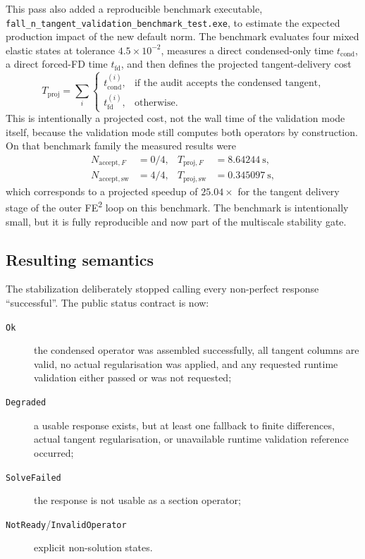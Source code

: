 This pass also added a reproducible benchmark executable,
\texttt{fall\_n\_tangent\_validation\_benchmark\_test.exe}, to estimate the
expected production impact of the new default norm.  The benchmark evaluates
four mixed elastic states at tolerance \(4.5\times 10^{-2}\), measures a
direct condensed-only time \(t_{\mathrm{cond}}\), a direct forced-FD time
\(t_{\mathrm{fd}}\), and then defines the projected tangent-delivery cost
\begin{equation}
  T_{\mathrm{proj}}
  =
  \sum_i
  \begin{cases}
    t_{\mathrm{cond}}^{(i)}, & \text{if the audit accepts the condensed tangent},\\
    t_{\mathrm{fd}}^{(i)}, & \text{otherwise.}
  \end{cases}
\end{equation}
This is intentionally a projected cost, not the wall time of the validation
mode itself, because the validation mode still computes both operators by
construction.  On that benchmark family the measured results were
\begin{align}
  N_{\mathrm{accept},F} &= 0/4, &
  T_{\mathrm{proj},F} &= 8.64244~\mathrm{s}, \\
  N_{\mathrm{accept},\mathrm{sw}} &= 4/4, &
  T_{\mathrm{proj},\mathrm{sw}} &= 0.345097~\mathrm{s},
\end{align}
which corresponds to a projected speedup of \(25.04\times\) for the tangent
delivery stage of the outer FE\textsuperscript{2} loop on this benchmark.  The
benchmark is intentionally small, but it is fully reproducible and now part of
the multiscale stability gate.

\subsection{Resulting semantics}

The stabilization deliberately stopped calling every non-perfect response
``successful''.  The public status contract is now:
\begin{description}
  \item[\texttt{Ok}] the condensed operator was assembled successfully, all
    tangent columns are valid, no actual regularisation was applied, and any
    requested runtime validation either passed or was not requested;
  \item[\texttt{Degraded}] a usable response exists, but at least one
    fallback to finite differences, actual tangent regularisation, or
    unavailable runtime validation reference occurred;
  \item[\texttt{SolveFailed}] the response is not usable as a section operator;
  \item[\texttt{NotReady}/\texttt{InvalidOperator}] explicit non-solution
    states.
\end{description}


